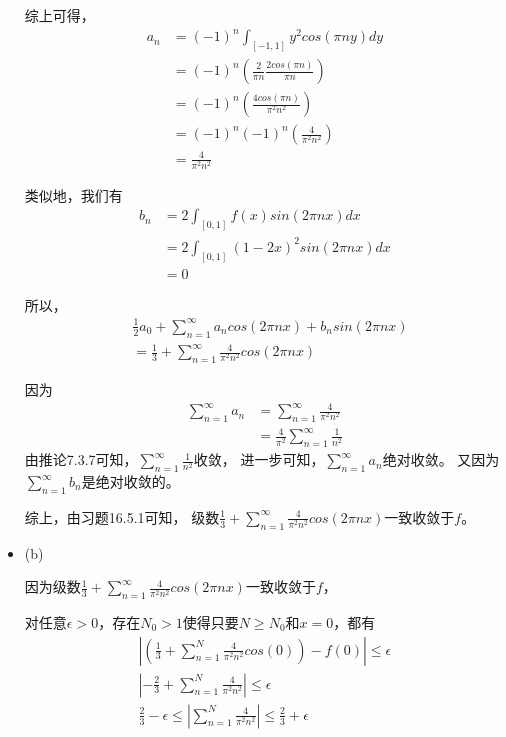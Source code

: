 \documentclass{article}
\begin{document}
\begin{itemize}
        综上可得，
        \begin{align*}
          a_n & =(-1)^n\int_{[-1, 1]} y^2 cos(\pi ny) dy            \\
              & = (-1)^n (\frac{2}{\pi n}\frac{2cos(\pi n)}{\pi n}) \\
              & = (-1)^n (\frac{4cos(\pi n)}{\pi^2 n^2})            \\
              & = (-1)^n(-1)^n (\frac{4}{\pi^2 n^2})                \\
              & = \frac{4}{\pi^2 n^2}
        \end{align*}

        类似地，我们有
        \begin{align*}
          b_n & = 2\int_{[0, 1]} f(x)sin(2\pi nx) dx        \\
              & = 2\int_{[0, 1]} (1 - 2x)^2 sin(2\pi nx) dx \\
              & = 0
        \end{align*}

        所以，
        \begin{align*}
           & \frac{1}{2}a_0 + \sum \limits_{n = 1}^\infty a_n cos(2\pi nx) + b_nsin(2\pi nx) \\
           & =\frac{1}{3} + \sum \limits_{n = 1}^\infty \frac{4}{\pi^2 n^2} cos(2\pi nx)
        \end{align*}

        因为
        \begin{align*}
          \sum \limits_{n = 1}^\infty a_n
           & = \sum \limits_{n = 1}^\infty \frac{4}{\pi^2 n^2}          \\
           & = \frac{4}{\pi^2}\sum \limits_{n = 1}^\infty \frac{1}{n^2}
        \end{align*}
        由推论7.3.7可知，$\sum \limits_{n = 1}^\infty \frac{1}{n^2}$收敛，
        进一步可知，$\sum \limits_{n = 1}^\infty a_n$绝对收敛。
        又因为$\sum \limits_{n = 1}^\infty b_n$是绝对收敛的。

        综上，由习题16.5.1可知，
        级数$\frac{1}{3} + \sum \limits_{n = 1}^\infty \frac{4}{\pi^2 n^2} cos(2\pi nx)$一致收敛于$f$。

  \item (b)

        因为级数$\frac{1}{3} + \sum \limits_{n = 1}^\infty \frac{4}{\pi^2 n^2} cos(2\pi nx)$一致收敛于$f$，

        对任意$\epsilon > 0$，存在$N_0 > 1$使得只要$N \geq N_0$和$x = 0$，都有
        \begin{align*}
          |(\frac{1}{3} + \sum \limits_{n = 1}^N \frac{4}{\pi^2 n^2} cos(0)) - f(0)| \leq \epsilon \\
          |-\frac{2}{3} + \sum \limits_{n = 1}^N \frac{4}{\pi^2 n^2}| \leq \epsilon                \\
          \frac{2}{3} - \epsilon \leq |\sum \limits_{n = 1}^N \frac{4}{\pi^2 n^2}| \leq \frac{2}{3} + \epsilon
        \end{align*}


\end{itemize}
\end{document}
